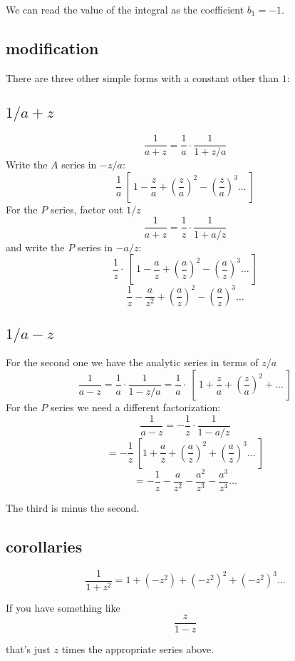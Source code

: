\documentclass[11pt, oneside]{article}
\begin{document}
We can read the value of the integral as the coefficient $b_1 = -1$.

\subsection*{modification}

There are three other simple forms with a constant other than $1$:

\subsection*{$1/a + z$}

\label{sec:a_plus_z}

\[ \frac{1}{a + z} = \frac{1}{a} \cdot \frac{1}{1 + z/a} \]
Write the $A$ series in $-z/a$:
\[ \frac{1}{a} \ [ \ 1 -\frac{z}{a} + (\frac{z}{a})^2 - (\frac{z}{a})^3 \dots \ ] \]
For the $P$ series, factor out $1/z$
\[ \frac{1}{a + z} = \frac{1}{z} \cdot \frac{1}{1 + a/z} \]
and write the $P$ series in $-a/z$:
\[ \frac{1}{z} \cdot \ [ \ 1 - \frac{a}{z} + (\frac{a}{z})^2 - (\frac{a}{z})^3 \dots \ ] \]
\[ \frac{1}{z} - \frac{a}{z^2} + (\frac{a}{z})^2 - (\frac{a}{z})^3 \dots  \]

\subsection*{$1/a - z$}

\label{sec:a_minus_z}

For the second one we have the analytic series in terms of $z/a$ 
\[ \frac{1}{a - z} = \frac{1}{a} \cdot \frac{1}{1 - z/a} = \frac{1}{a} \cdot \ [ \ 1 +  \frac{z}{a} + (\frac{z}{a})^2 + \dots \ ] \]
For the $P$ series we need a different factorization:
\[ \frac{1}{a - z} = -\frac{1}{z} \cdot \frac{1}{1 - a/z} \]
\[ = -\frac{1}{z} \ [ 1 +  \frac{a}{z} + (\frac{a}{z})^2 + (\frac{a}{z})^3 \dots \ ]  \]
\[ = -\frac{1}{z} - \frac{a}{z^2} - \frac{a^2}{z^3} - \frac{a^3}{z^4} \dots  \]

The third is minus the second.

\label{sec:z_minus_a}

\subsection*{corollaries}

\[ \frac{1}{1 + z^2} = 1 + (-z^2) + (-z^2)^2 + (-z^2)^3 \dots \]

If you have something like
\[ \frac{z}{1 - z} \]

that's just $z$ times the appropriate series above.
\end{document}
